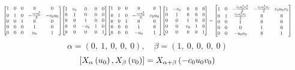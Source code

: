 \documentclass[11pt]{article}
\theoremstyle{definition}
\begin{document}
\[
\scaletoalign{\textwidth}{{\left[\begin{matrix}1 & 0 & 0 & 0 & 0\\0 & 1 & 0 & - \frac{c_{0} u_{0}^{2}}{2} & - c_{0} u_{0}\\0 & 0 & 1 & 0 & 0\\0 & 0 & 0 & 1 & 0\\0 & 0 & 0 & u_{0} & 1\end{matrix}\right]} {\left[\begin{matrix}1 & v_{0} & 0 & 0 & 0\\0 & 1 & 0 & 0 & 0\\0 & 0 & 1 & 0 & 0\\0 & 0 & - v_{0} & 1 & 0\\0 & 0 & 0 & 0 & 1\end{matrix}\right]} {\left[\begin{matrix}1 & 0 & 0 & 0 & 0\\0 & 1 & 0 & - \frac{c_{0} u_{0}^{2}}{2} & c_{0} u_{0}\\0 & 0 & 1 & 0 & 0\\0 & 0 & 0 & 1 & 0\\0 & 0 & 0 & - u_{0} & 1\end{matrix}\right]} {\left[\begin{matrix}1 & - v_{0} & 0 & 0 & 0\\0 & 1 & 0 & 0 & 0\\0 & 0 & 1 & 0 & 0\\0 & 0 & v_{0} & 1 & 0\\0 & 0 & 0 & 0 & 1\end{matrix}\right]} = {\left[\begin{matrix}1 & 0 & - \frac{c_{0} u_{0}^{2} v_{0}^{2}}{2} & - \frac{c_{0} u_{0}^{2} v_{0}}{2} & c_{0} u_{0} v_{0}\\0 & 1 & \frac{c_{0} u_{0}^{2} v_{0}}{2} & 0 & 0\\0 & 0 & 1 & 0 & 0\\0 & 0 & 0 & 1 & 0\\0 & 0 & - u_{0} v_{0} & 0 & 1\end{matrix}\right]}}
\]
\[
\alpha = \left( 0, \  1, \  0, \  0, \  0\right), \quad \beta = \left( 1, \  0, \  0, \  0, \  0\right)
\]
\[
\scaletoalign{\textwidth}{\left[ X_{\alpha}\left(u_{0}\right), X_{\beta}\left(v_{0}\right) \right] = X_{\alpha + \beta}\left(- c_{0} u_{0} v_{0}\right)}
\]
\end{document}
